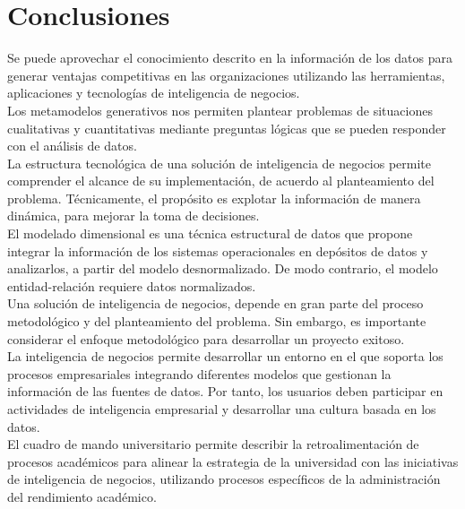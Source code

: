 \documentclass[11pt,titlepage]{report}
\begin{document}

\section{Conclusiones}

Se puede aprovechar el conocimiento descrito en la información de los datos para generar ventajas competitivas en las organizaciones utilizando las herramientas, aplicaciones y tecnologías de inteligencia de negocios.\\

Los metamodelos generativos nos permiten plantear problemas de situaciones cualitativas y cuantitativas mediante preguntas lógicas que se pueden responder con el análisis de datos.\\

La estructura tecnológica de una solución de inteligencia de negocios permite comprender el alcance de su implementación, de acuerdo al planteamiento del problema. Técnicamente, el propósito es explotar la información de manera dinámica, para mejorar la toma de decisiones.\\

El modelado dimensional es una técnica estructural de datos que propone integrar la información de los sistemas operacionales en depósitos de datos y analizarlos, a partir del modelo desnormalizado. De modo contrario, el modelo entidad-relación requiere datos normalizados.\\

Una solución de inteligencia de negocios, depende en gran parte del proceso metodológico y del planteamiento del problema. Sin embargo, es importante considerar el enfoque metodológico para desarrollar un proyecto exitoso.\\

La inteligencia de negocios permite desarrollar un entorno en el que soporta los procesos empresariales integrando diferentes modelos que gestionan la información de las fuentes de datos. Por tanto, los usuarios deben participar en actividades de inteligencia empresarial y desarrollar una cultura basada en los datos.\\

El cuadro de mando universitario permite describir la retroalimentación de procesos académicos para alinear la estrategia de la universidad con las iniciativas de inteligencia de negocios, utilizando procesos específicos de la administración del rendimiento académico.
\end{document}
